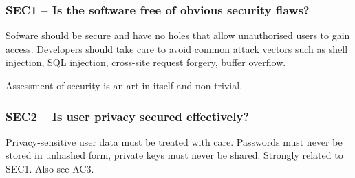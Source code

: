 \documentclass[a4paper,11pt]{article}
\begin{document}
\subsubsection{SEC1 -- Is the software free of obvious security flaws?}

Sofware should be secure and have no holes that allow unauthorised users to
gain access. Developers should take care to avoid common attack vectors such as shell
injection, SQL injection, cross-site request forgery, buffer overflow. 

Assessment of security is an art in itself and non-trivial. 

\subsubsection{SEC2 -- Is user privacy secured effectively?}

Privacy-sensitive user data must be treated with care. Passwords must never be
stored in unhashed form, private keys must never be shared. Strongly related to
SEC1. Also see AC3.
\end{document}
